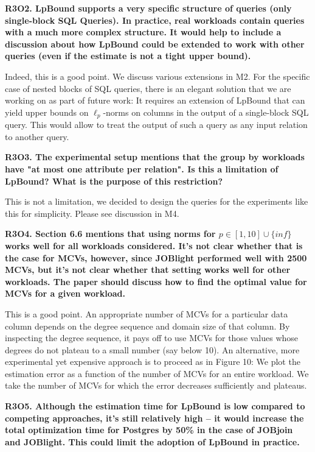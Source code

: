 \vspace{0.5em}\noindent
\textbf{
R3O2. LpBound supports a very specific structure of queries (only single-block SQL Queries). In practice, real workloads contain queries with a much more complex structure. It would help to include a discussion about how LpBound could be extended to work with other queries (even if the estimate is not a tight upper bound). 
}


{
\color{blue}
Indeed, this is a good point. We discuss various extensions in M2. For the specific case of nested blocks of SQL queries, there is an elegant solution that we are working on as part of future work: It requires an extension of LpBound that can yield upper bounds on $\ell_p$-norms on columns in the output of a single-block SQL query. This would allow to treat the output of such a query as any input relation to another query.
}


\vspace{0.5em}\noindent
\textbf{
R3O3. The experimental setup mentions that the group by workloads have "at most one attribute per relation". Is this a limitation of LpBound? What is the purpose of this restriction? 
}

{
\color{blue}
This is not a limitation, we decided to design the queries for the experiments like this for simplicity. Please see discussion in M4.
}


\vspace{0.5em}\noindent
\textbf{
R3O4. Section 6.6 mentions that using norms for $p \in [1, 10] \cup \{inf\}$ works well for all workloads considered. It's not clear whether that is the case for MCVs, however, since JOBlight performed well with 2500 MCVs, but it's not clear whether that setting works well for other workloads. The paper should discuss how to find the optimal value for MCVs for a given workload. 
}

{
\color{blue}
This is a good point. An appropriate number of MCVs for a particular data column depends on the degree sequence and domain size of that column. By inspecting the degree sequence, it pays off to use MCVs for those values whose degrees do not plateau to a small number (say below 10). An alternative, more experimental yet expensive approach is to proceed as in Figure 10: We plot the estimation error as a function of the number of MCVs for an entire workload. We take the number of MCVs for which the error decreases sufficiently and plateaus. 
}

\vspace{0.5em}\noindent
\textbf{
R3O5. Although the estimation time for LpBound is low compared to competing approaches, it's still relatively high -- it would increase the total optimization time for Postgres by 50\% in the case of JOBjoin and JOBlight. This could limit the adoption of LpBound in practice. 
}

